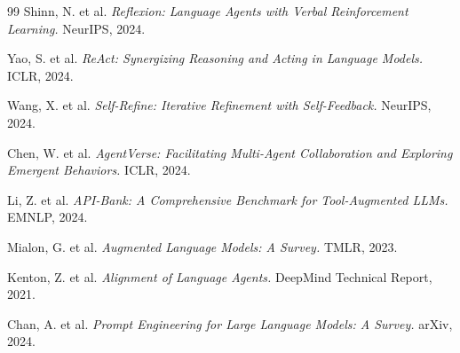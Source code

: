 \documentclass[11pt,a4paper]{article}
\begin{document}
\begin{thebibliography}{99}
Shinn, N. et al. \textit{Reflexion: Language Agents with Verbal Reinforcement Learning.} NeurIPS, 2024.

Yao, S. et al. \textit{ReAct: Synergizing Reasoning and Acting in Language Models.} ICLR, 2024.

Wang, X. et al. \textit{Self-Refine: Iterative Refinement with Self-Feedback.} NeurIPS, 2024.

Chen, W. et al. \textit{AgentVerse: Facilitating Multi-Agent Collaboration and Exploring Emergent Behaviors.} ICLR, 2024.

Li, Z. et al. \textit{API-Bank: A Comprehensive Benchmark for Tool-Augmented LLMs.} EMNLP, 2024.

Mialon, G. et al. \textit{Augmented Language Models: A Survey.} TMLR, 2023.

Kenton, Z. et al. \textit{Alignment of Language Agents.} DeepMind Technical Report, 2021.

Chan, A. et al. \textit{Prompt Engineering for Large Language Models: A Survey.} arXiv, 2024.

\end{thebibliography}
\end{document}
